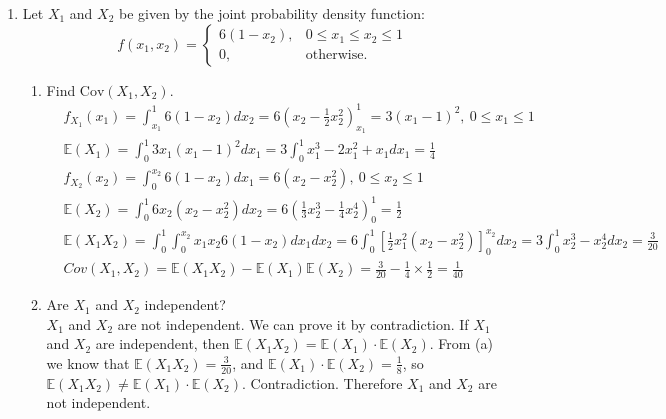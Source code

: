 \documentclass[11pt]{article}
\newcommand{\e}{\mathbb{E}}
\newcommand{\cov}{\text{Cov}}
\begin{document}
\begin{enumerate}[label=\textbf{Question \arabic*:},start=1]
\item Let $X_1$ and $X_2$ be given by the joint probability density function:
\[
f(x_1,x_2) =
\begin{cases}
	6(1-x_2),	& 0\leq x_1\leq x_2\leq 1 \\
	0,		& \text{otherwise}.
\end{cases}
\]
\begin{enumerate}
	\item Find $\cov(X_1,X_2)$.\\
	\begin{align*}
	& f_{X_1}(x_1) = \int_{x_1}^{1} 6 (1 - x_2) dx_2 = 6 (x_2 - \frac{1}{2} x_2^2)_{x_1}^1 = 3 (x_1 - 1)^2,\ 0 \leq x_1 \leq 1 \\
	& \e{(X_1)} = \int_0^1 3x_1(x_1 - 1)^2 dx_1 = 3 \int_0^1 x_1^3 - 2x_1^2 + x_1 dx_1 = \frac{1}{4} \\
	& f_{X_2}(x_2) = \int_0^{x_2} 6(1-x_2) dx_1 = 6(x_2 - x_2^2),\ 0 \leq x_2 \leq 1 \\
	& \e{(X_2)} = \int_0^1 6 x_2 (x_2 - x_2^2) dx_2 = 6 (\frac{1}{3} x_2^3 - \frac{1}{4} x_2^4)_0^1 = \frac{1}{2} \\
	& \e{(X_1X_2)} = \int_0^1 \int_0^{x_2} x_1 x_2 6 (1-x_2) dx_1 dx_2 =  6 \int_0^1 [\frac{1}{2} x_1^2 (x_2 - x_2^2)]_0^{x_2} dx_2 = 3 \int_0^1 x_2^3 - x_2^4 dx_2 = \frac{3}{20} \\
	& Cov(X_1, X_2) = \e{(X_1X_2)} - \e{(X_1)}\e{(X_2)} = \frac{3}{20} - \frac{1}{4} \times \frac{1}{2} = \frac{1}{40}
	\end{align*}
	
	\item Are $X_1$ and $X_2$ independent?\\
	
	$X_1$ and $X_2$ are not independent. We can prove it by contradiction. If $X_1$ and $X_2$ are independent, then $\e{(X_1X_2)} = \e{(X_1)} \cdot \e{(X_2)}$. From (a) we know that $\e{(X_1X_2)} = \frac{3}{20}$, and $\e{(X_1)} \cdot \e{(X_2)} = \frac{1}{8}$,  so $\e{(X_1X_2)} \neq \e{(X_1)} \cdot \e{(X_2)}$. Contradiction. Therefore $X_1$ and $X_2$ are not independent.\\


\end{enumerate}
\end{enumerate}
\end{document}
